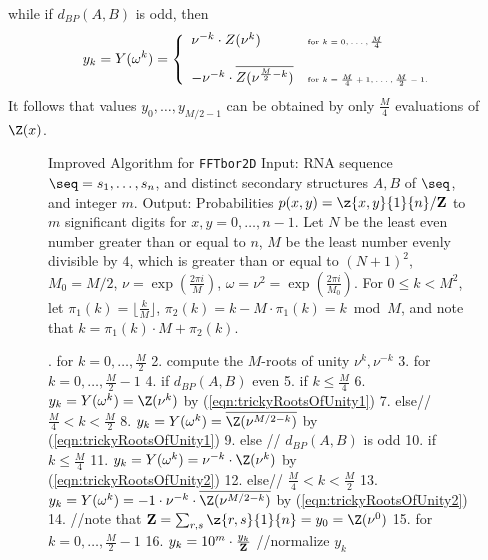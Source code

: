 while if $d_{BP}(A,B)$ is odd, then
\begin{eqnarray}
\label{eqn:trickyRootsOfUnity2}
y_k = Y(\omega^k) = \left\{
\begin{array}{ll}
\nu^{-k} \cdot Z(\nu^k) &\mbox{\tiny for $k=0,\ldots,\frac{M}{4}$}\\
\quad & \quad\\
-\nu^{-k} \cdot \overline{Z(\nu^{\frac{M}{2}-k})} &\mbox{\tiny for $k=\frac{M}{4}+1,\ldots,\frac{M}{2}-1$.}\\
\end{array} \right.
\end{eqnarray}
It follows that values $y_0,\ldots,y_{M/2-1}$ can be obtained by only
$\frac{M}{4}$ evaluations of $\Z(x)$.


\begin{figure}[!h]
\begin{small}
{\sc Improved Algorithm} for {\tt FFTbor2D}\hfill\break
{\sc Input:} RNA sequence $\seq=s_1,\ldots,s_n$, and distinct secondary
structures $A,B$ of $\seq$, and integer $m$. \hfill\break
{\sc Output:} Probabilities $p(x,y)=\z{x,y}{1}{n}/{\bf Z}$
to $m$ significant digits for $x,y=0,\ldots,n-1$.
Let $N$ be the least even number greater than or equal
to $n$, $M$ be the least number evenly divisible by $4$, which is greater than
or equal to $(N+1)^2$, $M_0=M/2$, $\nu = \exp(\frac{2\pi i}{M})$,
$\omega=\nu^2= \exp(\frac{2\pi i}{M_0})$. For $0 \leq k < M^2$, let
$\pi_1(k) = \lfloor \frac{k}{M} \rfloor$,
$\pi_2(k) = k - M \cdot \pi_1(k) = k \bmod M$, and note that
$k=\pi_1(k)\cdot M + \pi_2(k)$.
\end{small}
\hfill\break
\smallskip
\begin{small}
.  for $k=0,\ldots,\frac{M}{2}$
2.    compute the $M$-roots of unity $\nu^k,\nu^{-k}$
3.  for $k=0,\ldots,\frac{M}{2}-1$
4.    if $d_{BP}(A,B)$ even
5.      if $k \leq \frac{M}{4}$
6.        $y_k = Y(\omega^k)=\Z(\nu^k)$ by (\ref{eqn:trickyRootsOfUnity1})
7.      else// $\frac{M}{4}<k<\frac{M}{2}$
8.        $y_k = Y(\omega^k)=\overline{\Z(\nu^{M/2-k})}$ by (\ref{eqn:trickyRootsOfUnity1})
9.    else // $d_{BP}(A,B)$ is odd
10.     if $k \leq \frac{M}{4}$
11.       $y_k = Y(\omega^k)=\nu^{-k} \cdot \Z(\nu^k)$ by (\ref{eqn:trickyRootsOfUnity2})
12.     else// $\frac{M}{4}<k<\frac{M}{2}$
13.       $y_k = Y(\omega^k)= -1 \cdot \nu^{-k} \cdot \overline{\Z(\nu^{M/2-k})}$ by (\ref{eqn:trickyRootsOfUnity2})
14. //note that ${\bf Z}=\sum_{r,s}\z{r,s}{1}{n}=y_0=\Z(\nu^0)$
15. for $k=0,\ldots,\frac{M}{2}-1$
16.   $y_k = 10^m \cdot \frac{y_k}{{\bf Z}}$ //normalize $y_k$

\end{small}
\end{figure}
